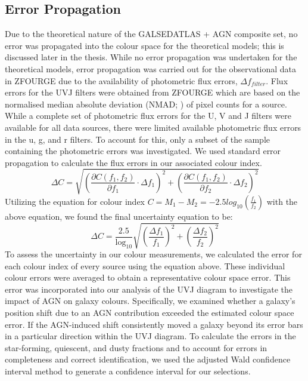 \subsection{Error Propagation}
Due to the theoretical nature of the GALSEDATLAS + AGN composite set, no error was propagated into the colour space for the theoretical models; this is discussed later in the thesis. While no error propagation was undertaken for the theoretical models, error propagation was carried out for the observational data in ZFOURGE due to the availability of photometric flux errors, $\Delta f_{filter}$. Flux errors for the UVJ filters were obtained from ZFOURGE which are based on the normalised median absolute deviation (NMAD; \citealt{straatman_fourstar_2016}) of pixel counts for a source. While a complete set of photometric flux errors for the U, V and J filters were available for all data sources, there were limited available photometric flux errors in the u, g, and r filters. To account for this, only a subset of the sample containing the photometric errors was investigated. We used standard error propagation to calculate the flux errors in our associated colour index.
\begin{equation*}
\Delta C = \sqrt{ \left( \frac{\partial C(f_1, f_2)}{\partial f_1} \cdot \Delta f_1 \right)^2 + \left( \frac{\partial C(f_1, f_2)}{\partial f_2} \cdot \Delta f_2 \right)^2 }
\end{equation*}
Utilizing the equation for colour index $C = M_1 - M_2 = -2.5log_{10}\left(\frac{f_1}{f_2}\right)$ with the above equation, we found the final uncertainty equation to be:
\begin{equation*}
\Delta C = \frac{2.5}{\log_{10}}\sqrt{\left(\frac{\Delta f_1}{f_1}\right)^2 + \left(\frac{\Delta f_2}{f_2}\right)^2}    
\end{equation*}
To assess the uncertainty in our colour measurements, we calculated the error for each colour index of every source using the equation above. These individual colour errors were averaged to obtain a representative colour space error. This error was incorporated into our analysis of the UVJ diagram to investigate the impact of AGN on galaxy colours. Specifically, we examined whether a galaxy's position shift due to an AGN contribution exceeded the estimated colour space error. If the AGN-induced shift consistently moved a galaxy beyond its error bars in a particular direction within the UVJ diagram. To calculate the errors in the star-forming, quiescent, and dusty fractions and to account for errors in completeness and correct identification, we used the adjusted Wald confidence interval method to generate a confidence interval for our selections. 
